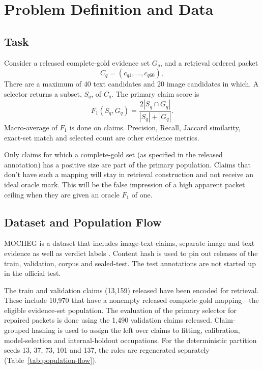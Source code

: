 \section{Problem Definition and Data}
\label{sec:problem}

\subsection{Task}

Consider a released complete-gold evidence set $G_q$, and a retrieval ordered packet
\begin{equation}
C_q=(c_{q1},\ldots,c_{q60}),
\end{equation}
There are a maximum of 40 text candidates and 20 image candidates in which. A selector returns a subset, $S_q$, of $C_q$. The primary claim score is
\begin{equation}
F_1(S_q,G_q)=\frac{2|S_q\cap G_q|}{|S_q|+|G_q|}.
\label{eq:set-f1}
\end{equation}
Macro-average of $F_1$ is done on claims. Precision, Recall, Jaccard similarity, exact-set match and selected count are other evidence metrics.

Only claims for which a complete-gold set (as specified in the released annotation) has a positive size are part of the primary population. Claims that don't have such a mapping will stay in retrieval construction and not receive an ideal oracle mark. This will be the false impression of a high apparent packet ceiling when they are given an oracle $F_1$ of one.

\subsection{Dataset and Population Flow}

MOCHEG is a dataset that includes image-text claims, separate image and text evidence as well as verdict labels \cite{yao2023mocheg}. Content hash is used to pin out releases of the train, validation, corpus and sealed-test. The test annotations are not started up in the official test.

The train and validation claims (13,159) released have been encoded for retrieval. These include 10,970 that have a nonempty released complete-gold mapping---the eligible evidence-set population. The evaluation of the primary selector for repaired packets is done using the 1,490 validation claims released. Claim-grouped hashing is used to assign the left over claims to fitting, calibration, model-selection and internal-holdout occupations. For the deterministic partition seeds 13, 37, 73, 101 and 137, the roles are regenerated separately (Table~\ref{tab:population-flow}).

